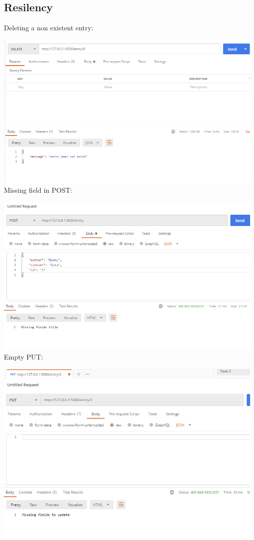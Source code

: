 \documentclass{article}
\begin{document}
    \subsection*{Resilency}

    Deleting a non existent entry:

    \includegraphics[width=\textwidth]{img/deleteOutRange.png}\\

    Missing field in POST:

    \includegraphics[width=\textwidth]{img/missingField.png}\\

    Empty PUT:

    \includegraphics[width=\textwidth]{img/missingPut.png}\\
\end{document}
